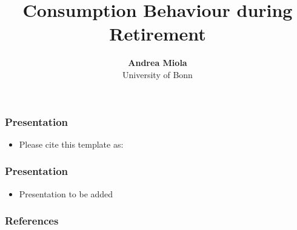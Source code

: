 \documentclass[11pt]{beamer}
\begin{document}
\title{Consumption Behaviour during Retirement}

\author[Andrea Miola]
{
{\bf Andrea Miola}\\
{\small University of Bonn}\\[1ex]
}


\begin{frame}
    \titlepage
    \note{~}
\end{frame}


\begin{frame}[t]
    \frametitle{Presentation}
    \begin{itemize}
        \item<+-> Please cite this template as: \citet{GaudeckerEconProjectTemplates}
   \end{itemize}
    \note{~}
\end{frame}


\begin{frame}[t]
    \frametitle{Presentation}
    \begin{itemize}
        \item<+-> Presentation to be added
   \end{itemize}
    \note{~}
\end{frame}

\begin{frame}[allowframebreaks]
    \frametitle{References}
    \nocite{*}
    
\end{frame}
\end{document}
